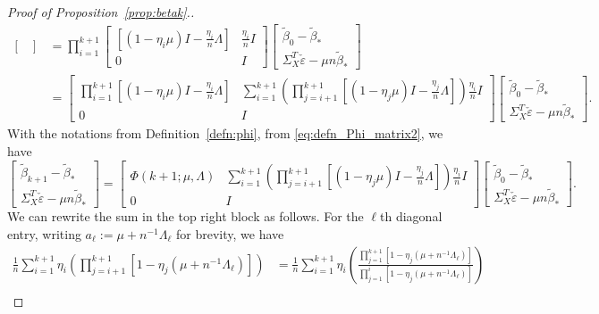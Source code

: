 \documentclass[11pt]{article}
\begin{document}
\begin{proof}[Proof of Proposition~\ref{prop:betak}.]
\begin{align*}
\begin{bmatrix}
    \end{bmatrix}
    &= \prod_{i=1}^{k+1}\begin{bmatrix} \left[(1-\eta_{i}\mu)I - \frac{\eta_{i}}{n}\Lambda\right] & \frac{\eta_{i}}{n}I \\ 0 & I \end{bmatrix} \begin{bmatrix} \tilde{\beta}_{0} - \tilde{\beta}_* \\ \Sigma_X^T\check{\varepsilon}  - \mu n \tilde{\beta}_*
    \end{bmatrix} \\
    &= \begin{bmatrix}\prod_{i=1}^{k+1}\left[(1-\eta_{i}\mu)I - \frac{\eta_{i}}{n}\Lambda\right] & \sum_{i=1}^{k+1}\left(\prod_{j=i+1}^{k+1} \left[(1-\eta_{j}\mu)I - \frac{\eta_{j}}{n}\Lambda\right]\right)\frac{\eta_{i}}{n}I \\ 0 & I \end{bmatrix} \begin{bmatrix} \tilde{\beta}_{0} - \tilde{\beta}_* \\ \Sigma_X^T\check{\varepsilon} - \mu n \tilde{\beta}_*
    \end{bmatrix}.
\end{align*}
With the notations from Definition~\ref{defn:phi}, from \eqref{eq:defn_Phi_matrix2}, we have 
\[
    \begin{bmatrix} \tilde{\beta}_{k+1} - \tilde{\beta}_* \\ \Sigma_X^T\check{\varepsilon} - \mu n \tilde{\beta}_* 
    \end{bmatrix}
    = \begin{bmatrix} \Phi(k+1; \mu, \Lambda) & \sum_{i=1}^{k+1}\left(\prod_{j=i+1}^{k+1} \left[(1-\eta_{j}\mu)I - \frac{\eta_{j}}{n}\Lambda\right]\right)\frac{\eta_{i}}{n}I \\ 0 & I \end{bmatrix} \begin{bmatrix} \tilde{\beta}_{0} - \tilde{\beta}_* \\ \Sigma_X^T\check{\varepsilon} - \mu n \tilde{\beta}_*
    \end{bmatrix}.
\]
We can rewrite the sum in the top right block as follows. For the $\ell$th diagonal entry, writing $a_\ell := \mu + n^{-1}\Lambda_\ell$ for brevity, we have
\begin{align}\label{eq:phis}
    \frac{1}{n}\sum_{i=1}^{k+1}\eta_i\left(\prod_{j=i+1}^{k+1} \left[1 - \eta_{j}(\mu + n^{-1}\Lambda_{\ell})\right]\right)
    &= \frac{1}{n}\sum_{i=1}^{k+1}\eta_i\left(\frac{\prod_{j=1}^{k+1} \left[1 - \eta_{j}(\mu + n^{-1}\Lambda_{\ell})\right]}{\prod_{j=1}^{i} \left[1 - \eta_{j}(\mu + n^{-1}\Lambda_{\ell}) \right]}\right) \nonumber\\

\end{align}
\end{proof}
\end{document}

